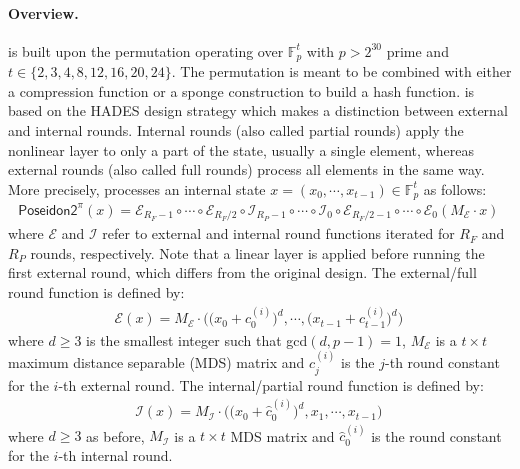 \paragraph{Overview.}
\PoseidonTwo is built upon the \PoseidonTwoPi permutation operating over $\mathbb{F}_p^t$ with $p > 2^{30}$ prime and $t \in \{2,3,4,8,12,16,20,24\}$. %
The permutation is meant to be combined with either a compression function or a sponge construction to build a hash function.
\PoseidonTwoPi is based on the HADES design strategy which makes a distinction between external and internal rounds.
Internal rounds (also called partial rounds) apply the nonlinear layer to only a part of the state, usually a single element, whereas external rounds (also called full rounds) process all elements in the same way.
More precisely, \PoseidonTwoPi processes an internal state $x = (x_0,\cdots,x_{t-1}) \in \mathbb{F}_p^t$ as follows:
\begin{align*}
 \mathsf{Poseidon2}^{\pi}(x) = \mathcal{E}_{R_F-1} \circ \cdots \circ \mathcal{E}_{R_F/2} \circ \mathcal{I}_{R_P-1} \circ \cdots \circ \mathcal{I}_{0}\circ \mathcal{E}_{R_F/2-1} \circ \cdots \circ \mathcal{E}_{0}(M_{\mathcal{E}} \cdot x) \,
\end{align*}
where $\mathcal{E}$ and $\mathcal{I}$ refer to external and internal round functions iterated for $R_F$ and $R_P$ rounds, respectively.
Note that a linear layer is applied before running the first external round, which differs from the original \PoseidonPi design.
The external/full round function is defined by:
\begin{align*}
 \mathcal{E}(x) = M_{\mathcal{E}} \cdot \Big(\big(x_0+c_0^{(i)}\big)^d,\cdots,\big(x_{t-1}+c_{t-1}^{(i)}\big)^d\Big) \,
\end{align*}
where $d \geq 3$ is the smallest integer such that gcd$(d,p-1) = 1$, $M_{\mathcal{E}}$ is a $t \times t$ maximum distance separable (MDS) matrix and $c_j^{(i)}$ is the $j$-th round constant for the $i$-th external round.
The internal/partial round function is defined by:
\begin{align*}
 \mathcal{I}(x) = M_{\mathcal{I}} \cdot \Big(\big(x_0+\hat{c}_0^{(i)}\big)^d,x_1,\cdots,x_{t-1}\Big) \,
\end{align*}
where $d \geq 3$ as before, $M_{\mathcal{I}}$ is a $t \times t$ MDS matrix and $\hat{c}_0^{(i)}$ is the round constant for the $i$-th internal round.


